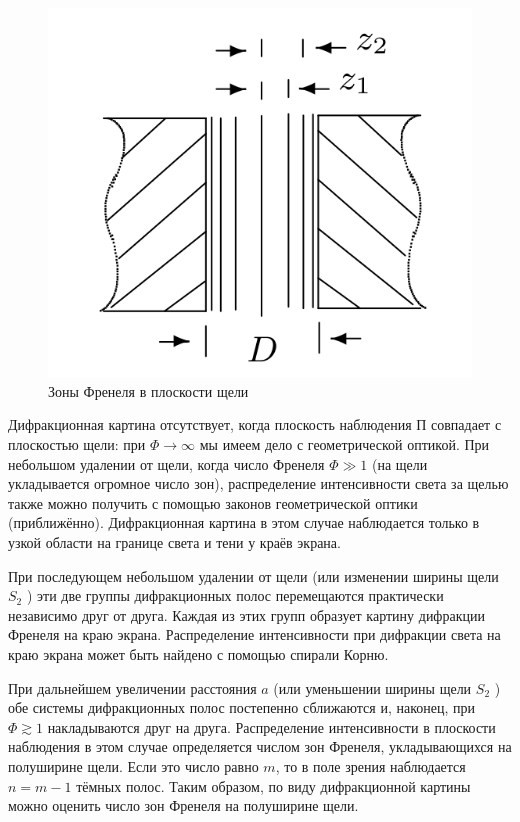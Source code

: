 \documentclass[a5paper,10pt, twoside]{article} %
\begin{document}
	\begin{figure} %
		\includegraphics[width=\linewidth]{zones.png}
		\caption{Зоны Френеля в	плоскости щели}
		\label{img:zones}
	\end{figure}

	Дифракционная картина отсутствует, когда плоскость наблюдения $\text{П}$ совпадает с плоскостью
	щели: при $\Phi \rightarrow \infty$ мы имеем дело с геометрической оптикой. При небольшом
	удалении от щели, когда число Френеля $\Phi \gg 1$ (на щели укладывается огромное число зон),
	распределение интенсивности света за щелью также можно получить с помощью законов геометрической
	оптики (приближённо). Дифракционная картина в этом случае наблюдается только в узкой области на
	границе света и тени у краёв экрана.

	При последующем небольшом удалении от щели (или изменении ширины щели $S_2$ ) эти две группы
	дифракционных полос перемещаются практически независимо друг от друга. Каждая из этих групп
	образует картину дифракции Френеля на краю экрана. Распределение интенсивности при дифракции
	света на краю экрана может быть найдено с помощью спирали Корню.


	При дальнейшем увеличении расстояния $a$ (или уменьшении ширины	щели $S_2$ ) обе системы
	дифракционных полос постепенно сближаются и, наконец, при $\Phi \gtrsim 1$ накладываются друг на
	друга. Распределение интенсивности в плоскости наблюдения в этом случае определяется числом
	зон Френеля, укладывающихся на полуширине щели. Если это число равно $m$, то в поле зрения
	наблюдается $n = m - 1$ тёмных полос. Таким образом, по виду дифракционной картины можно оценить число
	зон Френеля на полуширине щели.
	
\end{document}
